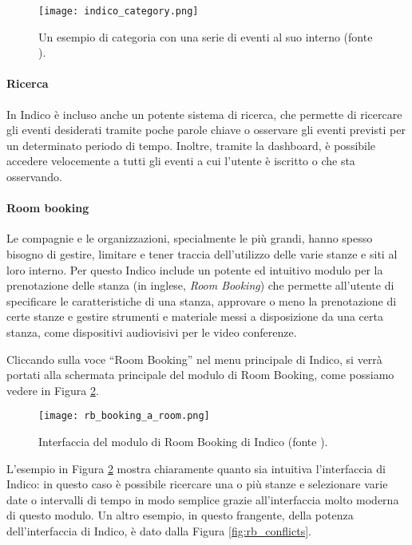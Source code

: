 		\begin{figure}[h!]
			\begin{center}
				\texttt{[image: indico\_category.png]}
			\end{center}
			\caption[Categoria in Indico (esempio)]{Un esempio di categoria con una serie di eventi al suo interno (fonte \cite{indico:user_guide_1.9.6}).}
			\label{fig:indico_category}
		\end{figure}
		
		\paragraph{Ricerca}In Indico è incluso anche un potente sistema di ricerca, che permette di ricercare gli eventi desiderati tramite poche parole chiave o osservare gli eventi previsti per un determinato periodo di tempo. Inoltre, tramite la dashboard, è possibile accedere velocemente a tutti gli eventi a cui l'utente è iscritto o che sta osservando.
		
		\paragraph{Room booking}Le compagnie e le organizzazioni, specialmente le più grandi, hanno spesso bisogno di gestire, limitare e tener traccia dell'utilizzo delle varie stanze e siti al loro interno. Per questo Indico include un potente ed intuitivo modulo per la prenotazione delle stanza (in inglese, \textit{Room Booking}) che permette all'utente di specificare le caratteristiche di una stanza, approvare o meno la prenotazione di certe stanze e gestire strumenti e materiale messi a disposizione da una certa stanza, come dispositivi audiovisivi per le video conferenze.
		
		Cliccando sulla voce ``Room Booking'' nel menu principale di Indico, si verrà portati alla schermata principale del modulo di Room Booking, come possiamo vedere in Figura \ref{fig:rb_booking_a_room}.
		
		\begin{figure}[h!]
			\begin{center}
				\texttt{[image: rb\_booking\_a\_room.png]}
			\end{center}
			\caption[Room Booking in Indico]{Interfaccia del modulo di Room Booking di Indico (fonte \cite{indico:user_guide_1.9.6}).}
			\label{fig:rb_booking_a_room}
		\end{figure}
		
		L'esempio in Figura \ref{fig:rb_booking_a_room} mostra chiaramente quanto sia intuitiva l'interfaccia di Indico: in questo caso è possibile ricercare una o più stanze e selezionare varie date o intervalli di tempo in modo semplice grazie all'interfaccia molto moderna di questo modulo. Un altro esempio, in questo frangente, della potenza dell'interfaccia di Indico, è dato dalla Figura \ref{fig:rb_conflicts}.
		
